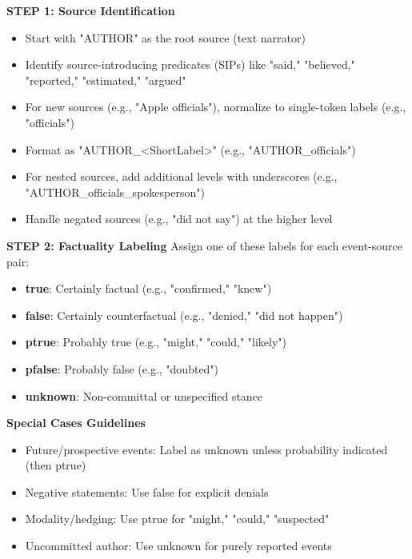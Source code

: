 \begin{figure*}[!ht]
\begin{tcolorbox}[
    width=\textwidth,
    colback=white,
    colframe=black,
    arc=4mm,
    boxrule=0.5pt,
    left=2mm,
    right=2mm,
    top=2mm,
    bottom=2mm,
    fonttitle=\bfseries,
    ]
\begin{tcolorbox}[
    colback=Periwinkle!20,
    boxrule=0pt,
    colframe=white,
    left=0pt,
    right=0pt,
    top=0pt,
    bottom=0pt,
    ]
\textbf{STEP 1: Source Identification}
\begin{itemize}[noitemsep, leftmargin=15pt, topsep=0pt]
    \item Start with "AUTHOR" as the root source (text narrator)
    \item Identify source-introducing predicates (SIPs) like "said," "believed," "reported," "estimated," "argued"
    \item For new sources (e.g., "Apple officials"), normalize to single-token labels (e.g., "officials")
    \item Format as "AUTHOR\_<ShortLabel>" (e.g., "AUTHOR\_officials")
    \item For nested sources, add additional levels with underscores (e.g., "AUTHOR\_officials\_spokesperson")
    \item Handle negated sources (e.g., "did not say") at the higher level
\end{itemize}

\textbf{STEP 2: Factuality Labeling}
Assign one of these labels for each event-source pair:
\begin{itemize}[noitemsep, leftmargin=15pt, topsep=0pt]
    \item \textbf{true}: Certainly factual (e.g., "confirmed," "knew")
    \item \textbf{false}: Certainly counterfactual (e.g., "denied," "did not happen")
    \item \textbf{ptrue}: Probably true (e.g., "might," "could," "likely")
    \item \textbf{pfalse}: Probably false (e.g., "doubted")
    \item \textbf{unknown}: Non-committal or unspecified stance
\end{itemize}

\textbf{Special Cases Guidelines}
\begin{itemize}[noitemsep, leftmargin=15pt, topsep=0pt]
    \item Future/prospective events: Label as unknown unless probability indicated (then ptrue)
    \item Negative statements: Use false for explicit denials
    \item Modality/hedging: Use ptrue for "might," "could," "suspected"
    \item Uncommitted author: Use unknown for purely reported events
\end{itemize}

\end{tcolorbox}


\end{tcolorbox}
\end{figure*}
